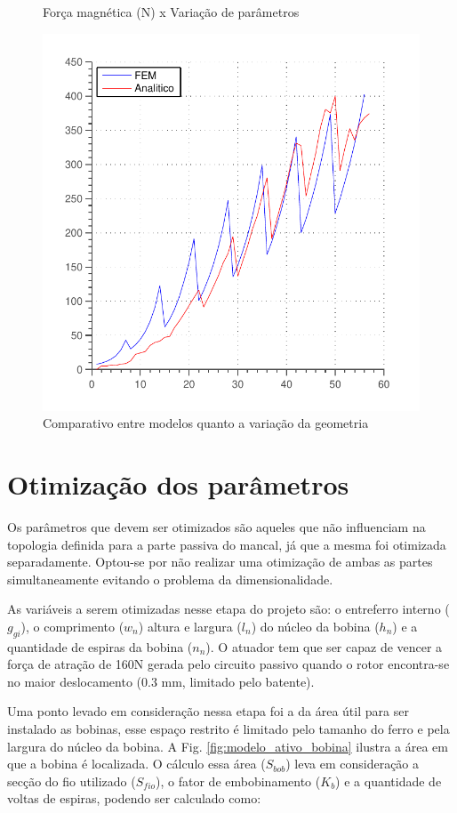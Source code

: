 \begin{figure}[th]
	\centering
	\caption{Força magnética (N) x Variação de parâmetros}
	\includegraphics[width=0.7\linewidth]{Figs/Simulacoes/Ativo/validacao_ativo_2d}
	\caption{Comparativo entre modelos quanto a variação da geometria}
	\label{fig:validacao_ativo_2d}
\end{figure}

\section{Otimização dos parâmetros}

Os parâmetros que devem ser otimizados são aqueles que não influenciam na topologia definida para a parte passiva do mancal, já que a mesma foi otimizada separadamente. Optou-se por não realizar uma otimização de ambas as partes simultaneamente evitando o problema da dimensionalidade.

As variáveis a serem otimizadas nesse etapa do projeto são: o entreferro interno ($g_{gi}$), o comprimento ($w_n$) altura  e largura ($l_n$) do núcleo da bobina ($h_n$) e a quantidade de espiras da bobina ($n_n$). O atuador tem que ser capaz de vencer a força de atração de 160N gerada pelo circuito passivo quando o rotor encontra-se no maior deslocamento (0.3 mm, limitado pelo batente). 

Uma ponto levado em consideração nessa etapa foi a da área útil para ser instalado as bobinas, esse espaço restrito é limitado pelo tamanho do ferro e pela largura do núcleo da bobina. A Fig. \ref{fig:modelo_ativo_bobina} ilustra a área em que a bobina é localizada. O cálculo essa área ($S_{bob}$) leva em consideração a secção do fio utilizado ($S_{fio}$), o fator de embobinamento ($K_b$) e a quantidade de voltas de espiras, podendo ser calculado como:

